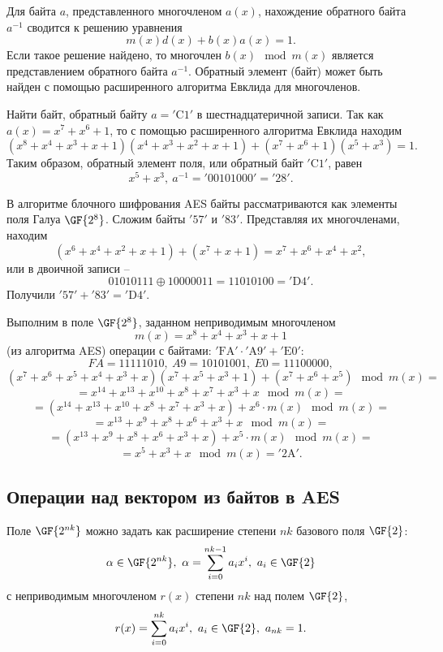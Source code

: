Для байта $a$, представленного многочленом $a(x)$, нахождение обратного байта $a^{-1}$ сводится к решению уравнения
    \[ m(x) d(x) + b(x) a(x) = 1. \]
Если такое решение найдено, то многочлен $b(x) \mod m(x)$ является представлением обратного байта $a^{-1}$. Обратный элемент (байт) может быть найден с помощью расширенного алгоритма Евклида для многочленов.

Найти байт, обратный байту $a = \mathrm{'C1'}$ в шестнадцатеричной записи. Так как $a(x) = x^{7} + x^{6} + 1$, то с помощью расширенного алгоритма Евклида находим
    \[ (x^{8} + x^{4} + x^{3} + x + 1) (x^{4} + x^{3} + x^{2} + x + 1) + (x^{7} + x^{6} + 1) (x^{5} + x^{3}) = 1. \]
Таким образом, обратный элемент поля, или обратный байт $\mathrm{'C1'}$, равен
    \[ x^{5} + x^{3}, ~ a^{-1} = \mathrm{'00101000'} = \mathrm{'28'}. \]
\exampleend

В алгоритме блочного шифрования AES байты рассматриваются как элементы поля Галуа $\GF{2^8}$. Сложим байты $\mathrm{'57'}$ и $\mathrm{'83'}$. Представляя их многочленами, находим
    \[ (x^6 + x^4 + x^2 + x + 1) + (x^7 + x + 1) = x^7 + x^6 + x^4 + x^2, \]
или в двоичной записи --
    \[ 01010111 \oplus 10000011 = 11010100 = \mathrm{'D4'}. \]
Получили $\mathrm{'57'} + \mathrm{'83'} = \mathrm{'D4'}$.
\exampleend

Выполним в поле $\GF{2^8}$, заданном неприводимым многочленом
    \[ m(x) = x^8 + x^4 + x^3 + x + 1 \]
(из алгоритма AES) операции с байтами: $\mathrm{'FA'} \cdot \mathrm{'A9'} + \mathrm{'E0'}$:
    \[ FA = 11111010, ~ A9 = 10101001, ~ E0 = 11100000, \]
    \[ (x^7 + x^6 + x^5 + x^4 + x^3  +x)(x^7 + x^5 + x^3 + 1) + (x^7 + x^6 + x^5) \mod m(x) = \]
    \[ = x^{14} + x^{13} + x^{10} + x^{8} + x^7 + x^3 + x \mod m(x) = \]
    \[ = (x^{14} + x^{13} + x^{10} + x^{8} + x^7 + x^3 + x) + x^6 \cdot m(x) \mod m(x) = \]
    \[ = x^{13} + x^9 + x^8 + x^6 + x^3 + x \mod m(x) = \]
    \[ = (x^{13} + x^9 + x^8 + x^6 + x^3 + x) + x^5 \cdot m(x) \mod m(x) = \]
    \[ = x^5 + x^3 + x \mod m(x) = \mathrm{'2A'}. \]
\exampleend


\subsection{Операции над вектором из байтов в AES}

Поле $\GF{2^{nk}}$ можно задать как расширение степени $nk$ базового поля $\GF{2}$:
    \[ \alpha \in \GF{2^{nk}}, ~ \alpha = \sum\limits_{i=0}^{nk-1} a_i x^i, ~ a_i \in \GF{2} \]
с неприводимым многочленом $r(x)$ степени $nk$ над полем $\GF{2}$,
    \[ r(x) = \sum\limits_{i=0}^{nk} a_i x^i, ~ a_i \in \GF{2}, ~ a_{nk} = 1. \]

